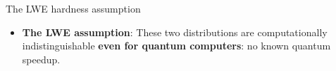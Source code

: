 \documentclass[aspectratio=169, lualatex, handout]{beamer}
\begin{document}
\begin{frame}{The LWE hardness assumption}
	\begin{center}
	\end{center}
	\vspace{5mm}
	\begin{itemize}
		\item \textbf{The LWE assumption}: These two distributions are computationally indistinguishable \textbf{even for quantum computers}: no known quantum speedup.
	\end{itemize}
\end{frame}
\end{document}
